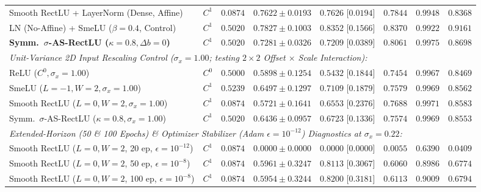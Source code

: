 \documentclass[10pt,a4paper]{article}
\begin{document}
\begin{table}[t]
\begin{tabular}{llcccccc}
Smooth RectLU + LayerNorm (Dense, Affine) & $C^1$ & $0.0874$ & $0.7622 \pm 0.0193$ & $0.7626$ [$0.0194$] & $0.7844$ & $0.9948$ & $0.8368$ \\
LN (No-Affine) + SmeLU ($\beta=0.4$, Control) & $C^1$ & $0.5020$ & $\mathbf{0.7827 \pm 0.1003}$ & $\mathbf{0.8352}$ [$0.1566$] & $\mathbf{0.8370}$ & $0.9922$ & $\mathbf{0.9161}$ \\
\textbf{Symm.\ $\sigma$-AS-RectLU ($\kappa=0.8, \Delta b=0$)} & $C^1$ & $0.5020$ & $0.7281 \pm 0.0326$ & $0.7209$ [$0.0389$] & $0.8061$ & $0.9975$ & $0.8698$ \\
\midrule
\multicolumn{8}{l}{\textit{Unit-Variance 2D Input Rescaling Control ($\sigma_x = 1.00$; testing $2 \times 2$ Offset $\times$ Scale Interaction):}} \\
ReLU ($C^0, \sigma_x=1.00$) & $C^0$ & $0.5000$ & $0.5898 \pm 0.1254$ & $0.5432$ [$0.1844$] & $0.7454$ & $0.9967$ & $0.8469$ \\
SmeLU ($L=-1, W=2, \sigma_x=1.00$) & $C^1$ & $0.5239$ & $0.6497 \pm 0.1297$ & $0.7109$ [$0.1879$] & $0.7579$ & $0.9969$ & $0.8562$ \\
Smooth RectLU ($L=0, W=2, \sigma_x=1.00$) & $C^1$ & $0.0874$ & $0.5721 \pm 0.1641$ & $0.6553$ [$0.2376$] & $0.7688$ & $0.9971$ & $0.8583$ \\
Symm.\ $\sigma$-AS-RectLU ($\kappa=0.8, \sigma_x=1.00$) & $C^1$ & $0.5020$ & $0.6436 \pm 0.0957$ & $0.6723$ [$0.1336$] & $0.7574$ & $0.9969$ & $0.8553$ \\
\midrule
\multicolumn{8}{l}{\textit{Extended-Horizon (50 \& 100 Epochs) \& Optimizer Stabilizer (Adam $\epsilon = 10^{-12}$) Diagnostics at $\sigma_x = 0.22$:}} \\
Smooth RectLU ($L=0, W=2$, 20 ep, $\epsilon=10^{-12}$) & $C^1$ & $0.0874$ & $0.0000 \pm 0.0000$ & $0.0000$ [$0.0000$] & $0.0055$ & $0.6390$ & $0.0409$ \\
Smooth RectLU ($L=0, W=2$, 50 ep, $\epsilon=10^{-8}$) & $C^1$ & $0.0874$ & $0.5961 \pm 0.3247$ & $0.8113$ [$0.3067$] & $0.6060$ & $0.8986$ & $0.6774$ \\
Smooth RectLU ($L=0, W=2$, 100 ep, $\epsilon=10^{-8}$) & $C^1$ & $0.0874$ & $0.5954 \pm 0.3244$ & $0.8200$ [$0.3181$] & $0.6113$ & $0.9009$ & $0.6794$ \\
\bottomrule
\end{tabular}
\end{table}
\end{document}
